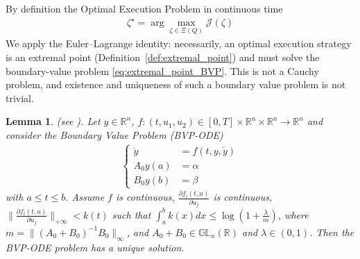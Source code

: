 \documentclass[final,3p,authoryear,12pt]{elsarticle}
\newtheorem{lemma}{Lemma}
\begin{document}
By definition the Optimal Execution Problem in continuous time
\begin{eqnarray}
\zeta^{\star} = \arg \max_{\zeta\in\Xi(Q)}\mathcal{J}(\zeta)
\end{eqnarray}
We apply the Euler--Lagrange identity: necessarily, an optimal execution
strategy is an extremal point (Definition~\ref{def:extremal_point}) and must
solve the boundary-value problem \eqref{eq:extremal_point_BVP}.
This is not a Cauchy problem, and existence and uniqueness of such a boundary value problem is not trivial. 
\begin{lemma}
\label{lemma:existenceanduniquenesstocontrolproblems}
(see \cite{keller2018numerical}). Let $y\in {\mathbb R}^n$, $f: (t,u_1,u_2)\in [0,T]\times\mathbb{R}^{n}\times\mathbb{R}^{n}\rightarrow \mathbb{R}^{n}$ and consider the Boundary Value Problem (BVP-ODE)
    \begin{align}
        \begin{cases}
            \ddot y  &= f(t,y,\dot y)\\
            A_0y(a)&=\alpha\\
            B_0y(b)&=\beta
        \end{cases}
    \end{align}
    with $a \le t \le b$.  Assume $f$ is continuous, $\frac{\partial f_{i}(t,u)}{\partial u_{j}}$ is continuous, $\lVert\frac{\partial f_{i}(t,u)}{\partial u_{j}}\rVert_{+\infty}<k(t)$ such that $\int_{a}^{b}k(x)dx\le \log(1+\frac{\lambda}{m})$, where $m=\lVert (A_0+B_0)^{-1}B_0\rVert_{\infty}$, and $A_0+B_0\in \mathbb{GL}_{n}(\mathbb{R})$ and $\lambda \in(0,1)$. Then the BVP-ODE problem has a unique solution.
\end{lemma}
\end{document}
